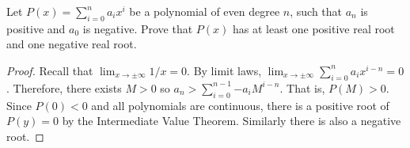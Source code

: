\documentclass[oneside]{book}
\begin{document}
\begin{Qns}{}{}
    Let \(P(x)=\sum_{i=0}^{n}{a_ix^i}\) be a polynomial of even degree \(n\), such that \(a_n\) is positive and \(a_0\) is negative. Prove that \(P(x)\) has at least one positive real root and one negative real root.
\end{Qns}
\begin{proof}
    Recall that \(\lim_{x \to \pm \infty}1/x=0\). By limit laws, \(\lim_{x \to \pm \infty}\sum_{i=0}^{n}{a_ix^{i-n}}=0\). Therefore, there exists \(M>0\) so \(a_n>\sum_{i=0}^{n-1}{-a_iM^{i-n}}\). That is, \(P(M)>0\). Since \(P(0)<0\) and all polynomials are continuous, there is a positive root of \(P(y)=0\) by the Intermediate Value Theorem. Similarly there is also a negative root.
\end{proof}
\end{document}
